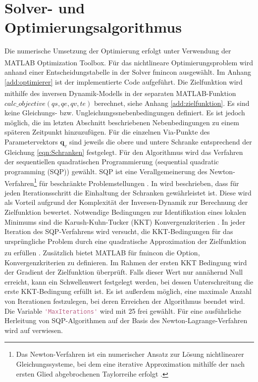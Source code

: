 \section{Solver- und Optimierungsalgorithmus}
Die numerische Umsetzung der Optimierung erfolgt unter Verwendung der MATLAB\textsuperscript{\textregistered} Optimization Toolbox\texttrademark. Für das nichtlineare Optimierungsproblem wird anhand einer Entscheidungstabelle in \cite[S.~80]{OptimizationToolbox.2023} der Solver fmincon ausgewählt.  Im Anhang \ref{add:optimierer} ist der implementierte Code aufgeführt. Die Zielfunktion wird mithilfe des inversen Dynamik-Modells in der separaten MATLAB\textsuperscript{\textregistered}-Funktion $calc\_objective(qs,qe,qv,te)$ berechnet, siehe Anhang \ref{add:zielfunktion}. Es sind keine Gleichungs- bzw. Ungleichungssnebenbedingungen definiert. Es ist jedoch möglich, die im letzten Abschnitt beschriebenen Nebenbedingungen zu einem späteren Zeitpunkt hinzuzufügen. Für die einzelnen Via-Punkte des Parametervektors $\bm{q}_{v}$ sind jeweils die obere und untere Schranke entsprechend der Gleichung \ref{eqn:Schranken} festgelegt. Für den Algorithmus wird das Verfahren der sequentiellen quadratischen Programmierung (sequential quadratic programming (SQP)) gewählt.  SQP ist eine Verallgemeinerung des Newton-Verfahren\footnote{Das Newton-Verfahren ist ein numerischer Ansatz zur Lösung nichtlinearer Gleichungssysteme, bei dem eine iterative Approximation mithilfe der nach ersten Glied abgebrochenen Taylorreihe erfolgt \cite[S.~46]{Papageorgiou.2015}.} für beschränkte Problemstellungen \cite[S.~113]{Papageorgiou.2015}. In \cite[S.~253]{OptimizationToolbox.2023} wird beschrieben, dass für jeden Iterationsschritt die Einhaltung der Schranken gewährleistet ist. Diese wird als Vorteil aufgrund der Komplexität  der Inversen-Dynamik zur Berechnung der Zielfunktion  bewertet. Notwendige Bedingungen zur Identifikation eines lokalen Minimums sind die  Karush-Kuhn-Tucker (KKT) Konvergenzkriterien  \cite[S.~321]{Nocedal.2006}.  In jeder Iteration des SQP-Verfahrens wird versucht, die KKT-Bedingungen für das ursprüngliche Problem durch eine quadratische Approximation der Zielfunktion zu erfüllen \cite[S.~337~ff.]{Reinhardt.2013}. Zusätzlich bietet MATLAB\textsuperscript{\textregistered} für fmincon die Option, Konvergenzkriterien zu definieren. Im Rahmen der ersten KKT Bedingung wird der Gradient der Zielfunktion überprüft. Falls dieser Wert nur annähernd Null erreicht, kann ein Schwellenwert festgelegt werden, bei dessen Unterschreitung die erste KKT-Bedingung erfüllt ist. Es ist außerdem möglich, eine maximale Anzahl von Iterationen festzulegen, bei deren Erreichen der Algorithmus beendet wird. Die Variable \lstinline[language=Matlab]|'MaxIterations'| wird mit 25 frei gewählt.  Für eine ausführliche Herleitung von SQP-Algorithmen auf der Basis des Newton-Lagrange-Verfahren wird auf \cite[S.~529~ff.]{Nocedal.2006} verwiesen.








